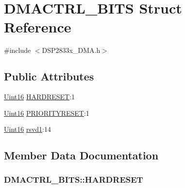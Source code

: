 \hypertarget{struct_d_m_a_c_t_r_l___b_i_t_s}{}\section{D\+M\+A\+C\+T\+R\+L\+\_\+\+B\+I\+T\+S Struct Reference}
\label{struct_d_m_a_c_t_r_l___b_i_t_s}


{\ttfamily \#include $<$D\+S\+P2833x\+\_\+\+D\+M\+A.\+h$>$}

\subsection*{Public Attributes}
\begin{DoxyCompactItemize}
\item 
\hyperlink{_d_s_p2833x___device_8h_a59a9f6be4562c327cbfb4f7e8e18f08b}{Uint16} \hyperlink{struct_d_m_a_c_t_r_l___b_i_t_s_a7c15255eafeb9ba2b64d61ce181e63b1}{H\+A\+R\+D\+R\+E\+S\+E\+T}\+:1
\item 
\hyperlink{_d_s_p2833x___device_8h_a59a9f6be4562c327cbfb4f7e8e18f08b}{Uint16} \hyperlink{struct_d_m_a_c_t_r_l___b_i_t_s_a797c9c9861146e7939354143c47cd215}{P\+R\+I\+O\+R\+I\+T\+Y\+R\+E\+S\+E\+T}\+:1
\item 
\hyperlink{_d_s_p2833x___device_8h_a59a9f6be4562c327cbfb4f7e8e18f08b}{Uint16} \hyperlink{struct_d_m_a_c_t_r_l___b_i_t_s_aa60ac0792a323bcdc65def49a829d9a7}{rsvd1}\+:14
\end{DoxyCompactItemize}


\subsection{Member Data Documentation}
\hypertarget{struct_d_m_a_c_t_r_l___b_i_t_s_a7c15255eafeb9ba2b64d61ce181e63b1}{}
\subsubsection[{H\+A\+R\+D\+R\+E\+S\+E\+T}]{ D\+M\+A\+C\+T\+R\+L\+\_\+\+B\+I\+T\+S\+::\+H\+A\+R\+D\+R\+E\+S\+E\+T}\label{struct_d_m_a_c_t_r_l___b_i_t_s_a7c15255eafeb9ba2b64d61ce181e63b1}
\hypertarget{struct_d_m_a_c_t_r_l___b_i_t_s_a797c9c9861146e7939354143c47cd215}{}
